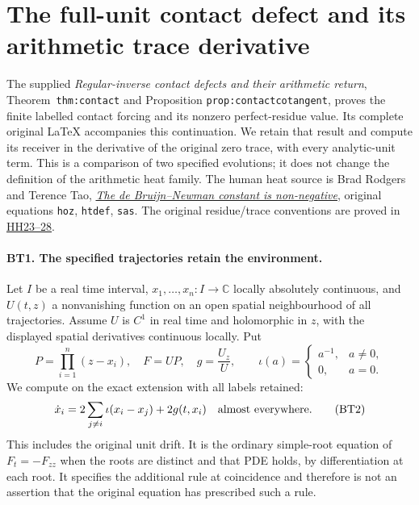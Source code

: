 \section{The full-unit contact defect and its arithmetic trace derivative}
\label{sec:contact-trace-variation}

The supplied \emph{Regular-inverse contact defects and their arithmetic
return}, Theorem~\texttt{thm:contact} and Proposition
\texttt{prop:contactcotangent}, proves the finite labelled contact
forcing and its nonzero perfect-residue value. Its complete original
LaTeX accompanies this continuation. We retain that result and compute
its receiver in the derivative of the original zero trace, with every
analytic-unit term. This is a comparison of two specified evolutions;
it does not change the definition of the arithmetic heat family.
The human heat source is Brad Rodgers and Terence Tao,
\href{https://arxiv.org/abs/1801.05914v5}{\emph{The de Bruijn--Newman
constant is non-negative}}, original equations \texttt{hoz},
\texttt{htdef}, \texttt{sas}. The original residue/trace conventions
are proved in
\href{https://github.com/KokunoYumeto/zeta-function-research-reader/blob/3c022a0adde0a6aa3d8fc8e43ef42795d88e44b0/workbenches/splitzero-tandem/continuations/20260923-supported-zero-collision-holonomy/HEAT_COLLISION_HOLONOMY.tex}{HH23--28}.

\paragraph{BT1. The specified trajectories retain the environment.}
Let $I$ be a real time interval, $x_1,\ldots,x_n:I\to\mathbb C$
locally absolutely continuous, and $U(t,z)$ a nonvanishing function
on an open spatial neighbourhood of all trajectories. Assume $U$ is
$C^1$ in real time and holomorphic in $z$, with the displayed spatial
derivatives continuous locally. Put
\[
 P=\prod_{i=1}^n(z-x_i),\quad F=UP,\quad
 g=\frac{U_z}{U},\qquad
 \iota(a)=\begin{cases}a^{-1},&a\ne0,\\0,&a=0.\end{cases}
 \tag{BT1}
\]
We compute on the exact extension with all labels retained:
\[
 \dot x_i=2\sum_{j\ne i}\iota(x_i-x_j)+2g(t,x_i)
 \quad\hbox{almost everywhere.}
 \tag{BT2}
\]
This includes the original unit drift. It is the ordinary simple-root
equation of $F_t=-F_{zz}$ when the roots are distinct and that PDE
holds, by differentiation at each root. It specifies the additional
rule at coincidence and therefore is not an assertion that the
original equation has prescribed such a rule.

